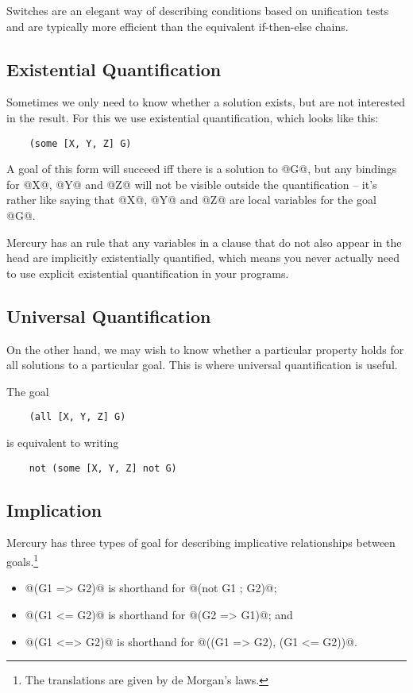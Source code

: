 \documentclass[a4paper,11pt,notitlepage,onecolumn]{article}
\begin{document}
Switches are an elegant way of describing conditions based on
unification tests and are typically more efficient than the
equivalent if-then-else chains.

\subsection{Existential Quantification}

Sometimes we only need to know whether a solution exists, but
are not interested in the result.  For this we use existential
quantification, which looks like this:
\begin{verbatim}
    (some [X, Y, Z] G)
\end{verbatim}
A goal of this form will succeed iff there is a solution to @G@,
but any bindings for @X@, @Y@ and @Z@ will not be visible outside
the quantification -- it's rather like saying that @X@, @Y@ and @Z@ 
are local variables for the goal @G@.

Mercury has an rule that any variables in a clause that do not
also appear in the head are implicitly existentially
quantified, which means you never actually need to use
explicit existential quantification in your programs.

\subsection{Universal Quantification}

On the other hand, we may wish to know whether a particular
property holds for all solutions to a particular goal.  This
is where universal quantification is useful.

The goal
\begin{verbatim}
    (all [X, Y, Z] G)
\end{verbatim}
is equivalent to writing
\begin{verbatim}
    not (some [X, Y, Z] not G)
\end{verbatim}

\subsection{Implication}

Mercury has three types of goal for describing implicative
relationships between goals.\footnote{The translations are given by de Morgan's laws.}
\begin{itemize}
\item @(G1 => G2)@ is shorthand for @(not G1 ; G2)@;
\item @(G1 <= G2)@ is shorthand for @(G2 => G1)@; and
\item @(G1 <=> G2)@ is shorthand for @((G1 => G2), (G1 <= G2))@.
\end{itemize}
\end{document}
